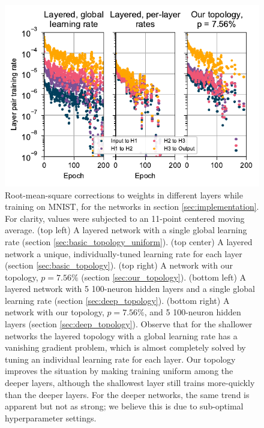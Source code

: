 \documentclass[utf8]{frontiersSCNS}
\begin{document}
\begin{figure}[h!]
\begin{center}
\includegraphics[width=\textwidth]{figures/MNIST_individual_layers.pdf}
\end{center}
\caption{Root-mean-square corrections to weights in different layers while training on MNIST, for the networks in section \ref{sec:implementation}. For clarity, values were subjected to an 11-point centered moving average. (top left) A layered network with a single global learning rate (section \ref{sec:basic_topology_uniform}). (top center) A layered network a unique, individually-tuned learning rate for each layer (section \ref{sec:basic_topology}).  (top right) A network with our topology, $p = 7.56\%$ (section \ref{sec:our_topology}). (bottom left) A layered network with 5 100-neuron hidden layers and a single global learning rate (section \ref{sec:deep_topology}). (bottom right) A network with our topology, $p=7.56\%$, and 5 100-neuron hidden layers (section \ref{sec:deep_topology}). Observe that for the shallower networks the layered topology with a global learning rate has a vanishing gradient problem, which is almost completely solved by tuning an individual learning rate for each layer. Our topology improves the situation by making training uniform among the deeper layers, although the shallowest layer still trains more-quickly than the deeper layers. For the deeper networks, the same trend is apparent but not as strong; we believe this is due to sub-optimal hyperparameter settings.}   \label{fig:mnist_layers}
\end{figure}
\end{document}
